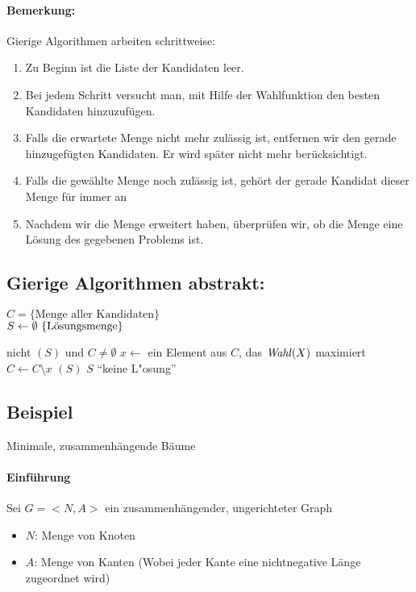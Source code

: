\documentclass[a4paper]{scrartcl}
\begin{document}
\paragraph{Bemerkung:} Gierige Algorithmen arbeiten schrittweise:
\begin{enumerate}
\item Zu Beginn ist die Liste der Kandidaten leer.
\item Bei jedem Schritt versucht man, mit Hilfe der Wahlfunktion den besten Kandidaten hinzuzufügen.
\item Falls die erwartete Menge nicht mehr zulässig ist, entfernen wir den gerade hinzugefügten Kandidaten. Er wird später nicht mehr berücksichtigt.
\item Falls die gewählte Menge noch zulässig ist, gehört der gerade Kandidat dieser Menge für immer an
\item Nachdem wir die Menge erweitert haben, überprüfen wir, ob die Menge eine Lösung des gegebenen Problems ist.
\end{enumerate}

\subsection{Gierige Algorithmen abstrakt:}
$C=\{\text{Menge aller Kandidaten}\}$\\
$S \la \emptyset\ \{\text{Lösungsmenge}\}$\\

\begin{codebox}
\li \While nicht $(S)$ und $C \neq \emptyset$
\li     \Do 
            $x \gets$ ein Element aus $C$, das $\id{Wahl}(X)$ maximiert
\li         $C \gets C \setminus {x}$
        \End
\li     \If {}$(S)$
\li     \Then
             $S$
\li     \Else
             "`keine L"osung"'
\end{codebox}

\subsection{Beispiel} Minimale, zusammenhängende Bäume
\paragraph{Einführung}
Sei $G=<N,A>$ ein zusammenhängender, ungerichteter Graph
\begin{itemize}
	\item $N$: Menge von Knoten
	\item $A$: Menge von Kanten (Wobei jeder Kante eine nichtnegative Länge zugeordnet wird)
\end{itemize}
\end{document}
